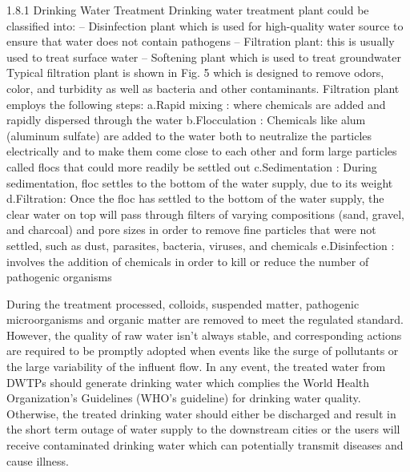 1.8.1 Drinking Water Treatment Drinking water treatment plant could be classified into: – Disinfection plant which is used for high-quality water source to ensure that water does not contain pathogens – Filtration plant: this is usually used to treat surface water – Softening plant which is used to treat groundwater Typical filtration plant is shown in Fig. 5 which is designed to remove odors, color, and turbidity as well as bacteria and other contaminants. Filtration plant employs the following steps: a.Rapid mixing : where chemicals are added and rapidly dispersed through the water b.Flocculation : Chemicals like alum (aluminum sulfate) are added to the water both to neutralize the particles electrically and to make them come close to each other and form large particles called flocs that could more readily be settled out c.Sedimentation : During sedimentation, floc settles to the bottom of the water supply, due to its weight d.Filtration: Once the floc has settled to the bottom of the water supply, the clear water on top will pass through filters of varying compositions (sand, gravel, and charcoal) and pore sizes in order to remove fine particles that were not settled, such as dust, parasites, bacteria, viruses, and chemicals e.Disinfection : involves the addition of chemicals in order to kill or reduce the number of pathogenic organisms



During the treatment processed, colloids, suspended matter, pathogenic microorganisms and organic matter are removed to meet the regulated standard. However, the quality of raw water isn't always stable, and corresponding actions are required to be promptly adopted when events like the surge of pollutants or the large variability of the influent flow. In any event, the treated water from DWTPs should generate drinking water which complies the World Health Organization's Guidelines (WHO's guideline) for drinking water quality. Otherwise, the treated drinking water should either be discharged and result in the short term outage of water supply to the downstream cities or the users will receive contaminated drinking water which can potentially transmit diseases and cause illness.

